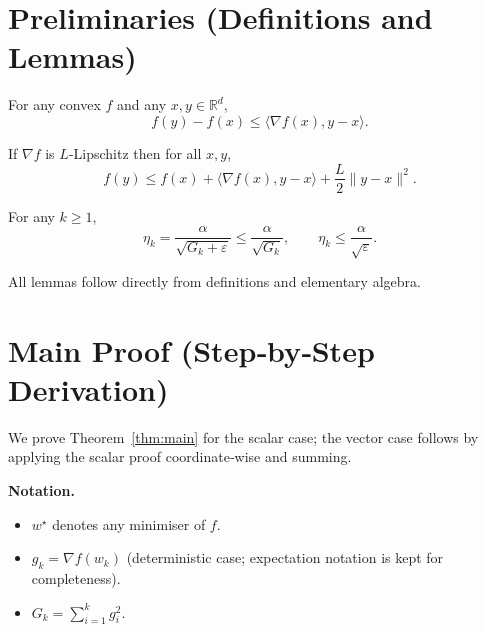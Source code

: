 \documentclass{article}
\begin{document}
\section*{Preliminaries (Definitions and Lemmas)}
\begin{lemma}\label{lem:conv}
For any convex $f$ and any $x,y\in\mathbb{R}^{d}$,
\[
f(y)-f(x)\le\langle\nabla f(x),y-x\rangle .
\]
\end{lemma}
\begin{lemma}\label{lem:smooth}
If $\nabla f$ is $L$‑Lipschitz then for all $x,y$,
\[
f(y)\le f(x)+\langle\nabla f(x),y-x\rangle+\frac{L}{2}\|y-x\|^{2}.
\]
\end{lemma}
\begin{lemma}\label{lem:step}
For any $k\ge1$,
\[
\eta_{k}= \frac{\alpha}{\sqrt{G_{k}+\varepsilon}}
\le \frac{\alpha}{\sqrt{G_{k}}},\qquad
\eta_{k}\le\frac{\alpha}{\sqrt{\varepsilon}} .
\]
\end{lemma}
All lemmas follow directly from definitions and elementary algebra.

\section*{Main Proof (Step‑by‑Step Derivation)}
We prove Theorem~\ref{thm:main} for the scalar case; the vector case follows
by applying the scalar proof coordinate‑wise and summing.

\noindent\textbf{Notation.}
\begin{itemize}
\item $w^{\star}$ denotes any minimiser of $f$.
\item $g_{k}= \nabla f(w_{k})$ (deterministic case; expectation notation is kept for
completeness).
\item $G_{k}= \sum_{i=1}^{k} g_{i}^{2}$.
\end{itemize}
\end{document}
